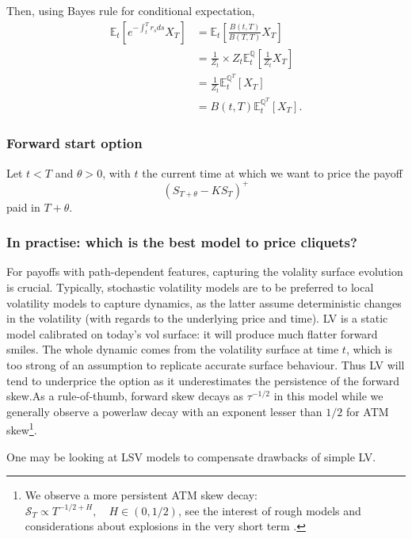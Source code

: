 Then, using Bayes rule for conditional expectation,
\begin{align*}
    \mathbb{E}_t\left[e^{-\int_t^T r_s ds} X_T\right] &= \mathbb{E}_t\left[\frac{B(t,T)}{B(T,T)} X_T \right]\\
    &= \frac{1}{Z_t} \times Z_t \mathbb{E}_t^{\mathbb{Q}}\left[\frac{1}{Z_t} X_T \right]\\
    &= \frac{1}{Z_t} \mathbb{E}_t^{\mathbb{Q}^{T}}\left[X_T \right]\\
    &= B(t,T) \mathbb{E}_t^{\mathbb{Q}^{T}}\left[X_T \right].
\end{align*}


\subsubsection*{Forward start option}

Let $t < T$ and $\theta>0$, with $t$ the current time at which we want to price the payoff \[(S_{T + \theta} - KS_{T})^{+}\] paid in $T+\theta$.

\subsubsection*{In practise: which is the best model to price cliquets?}

For payoffs with path-dependent features, capturing the volality surface evolution is crucial. Typically, stochastic volatility models are to be preferred to local volatility models to capture dynamics, as the latter assume deterministic changes in the volatility (with regards to the underlying price and time). \newline LV is a static model calibrated on today's vol surface: it will produce much flatter forward smiles. The whole dynamic comes from the volatility surface at time $t$, which is too strong of an assumption to replicate accurate surface behaviour. Thus LV will tend to underprice the option as it underestimates the persistence of the forward skew.\newline As a rule-of-thumb, forward skew decays as $\tau^{-1/2}$ in this model \cite{lee2005implied} while we generally observe a powerlaw decay with an exponent lesser than $1/2$ for ATM skew\footnote{We observe a more persistent ATM skew decay: $\mathcal{S}_T \propto T^{-1/2 + H}, \quad H \in (0, 1/2)$, see the interest of rough models \cite{fukasawa2017short} and considerations about explosions in the very short term \cite{guyon2022does}.}.

One may be looking at LSV models to compensate drawbacks of simple LV.